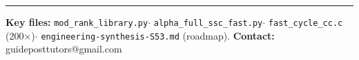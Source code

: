 \documentclass[10pt,letterpaper]{article}
\begin{document}
\vspace{3pt}\hrule\vspace{3pt}
{\small\textbf{Key files:}
\texttt{mod\_rank\_library.py}\;$\cdot$\;
\texttt{alpha\_full\_ssc\_fast.py}\;$\cdot$\;
\texttt{fast\_cycle\_cc.c} (200$\times$)\;$\cdot$\;
\texttt{engineering-synthesis-S53.md} (roadmap).
\quad\textbf{Contact:} guideposttutors@gmail.com}
\end{document}
